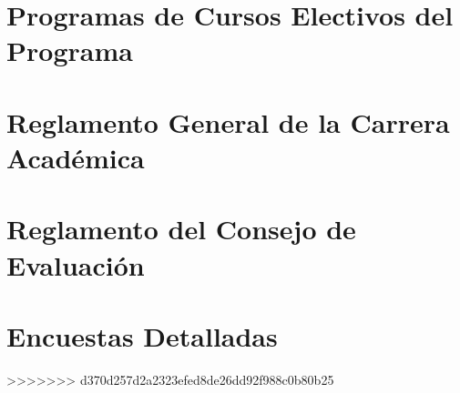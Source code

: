 \documentclass[11pt,fleqn]{book} %
\begin{document}
\section{Programas de Cursos Electivos del Programa}\label{prog_elect}


\section{Reglamento General de la Carrera Académica}\label{reg_carrera}


\section{Reglamento del Consejo de Evaluación}\label{reg_cons_eval}


\section{Encuestas Detalladas}\label{enc_det}

\fi

>>>>>>> d370d257d2a2323efed8de26dd92f988c0b80b25



% 
\end{document}
